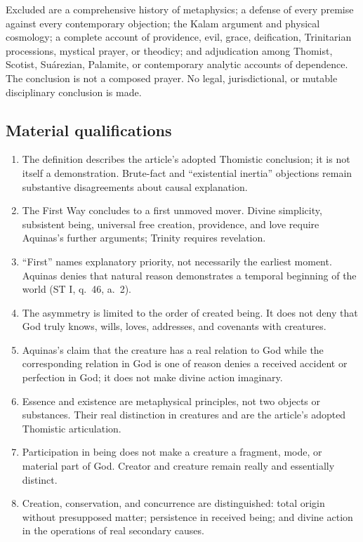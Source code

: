Excluded are a comprehensive history of metaphysics; a defense of every premise against every contemporary objection; the Kalam argument and physical cosmology; a complete account of providence, evil, grace, deification, Trinitarian processions, mystical prayer, or theodicy; and adjudication among Thomist, Scotist, Suárezian, Palamite, or contemporary analytic accounts of dependence. The conclusion is not a composed prayer. No legal, jurisdictional, or mutable disciplinary conclusion is made.

\subsection{Material qualifications}

\begin{enumerate}[leftmargin=1.45em,itemsep=0.25em]
\item The definition describes the article's adopted Thomistic conclusion; it is not itself a demonstration. Brute-fact and ``existential inertia'' objections remain substantive disagreements about causal explanation.
\item The First Way concludes to a first unmoved mover. Divine simplicity, subsistent being, universal free creation, providence, and love require Aquinas's further arguments; Trinity requires revelation.
\item ``First'' names explanatory priority, not necessarily the earliest moment. Aquinas denies that natural reason demonstrates a temporal beginning of the world (ST I, q.~46, a.~2).
\item The asymmetry is limited to the order of created being. It does not deny that God truly knows, wills, loves, addresses, and covenants with creatures.
\item Aquinas's claim that the creature has a real relation to God while the corresponding relation in God is one of reason denies a received accident or perfection in God; it does not make divine action imaginary.
\item Essence and existence are metaphysical principles, not two objects or substances. Their real distinction in creatures and  are the article's adopted Thomistic articulation.
\item Participation in being does not make a creature a fragment, mode, or material part of God. Creator and creature remain really and essentially distinct.
\item Creation, conservation, and concurrence are distinguished: total origin without presupposed matter; persistence in received being; and divine action in the operations of real secondary causes.

\end{enumerate}
